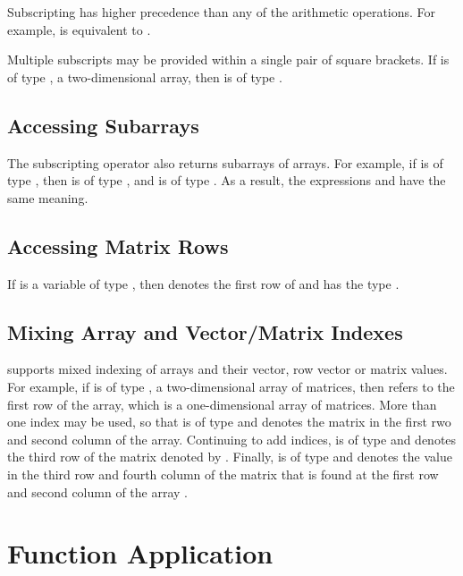 Subscripting has higher precedence than any of the arithmetic
operations.  For example,  is equivalent to
.  

Multiple subscripts may be provided within a single pair of square
brackets.  If  is of type , a two-dimensional
array, then  is of type .

\subsection{Accessing Subarrays}

The subscripting operator also returns subarrays of arrays.  For
example, if  is of type , then 
is of type , and  is of type
.  As a result, the expressions  and
 have the same meaning.  

\subsection{Accessing Matrix Rows}

If  is a variable of type , then
 denotes the first row of  and has the
type .  

\subsection{Mixing Array and Vector/Matrix Indexes}

\Stan supports mixed indexing of arrays and their vector, row vector
or matrix values.  For example, if  is of type
, a two-dimensional array of matrices, then
 refers to the first row of the array, which is a
one-dimensional array of matrices.  More than one index may be used,
so that  is of type  and denotes the matrix
in the first rwo and second column of the array.  Continuing to add
indices,  is of type  and denotes
the third row of the matrix denoted by .  Finally,
 is of type  and denotes the value in the
third row and fourth column of the matrix that is found at the first
row and second column of the array .

\section{Function Application}

